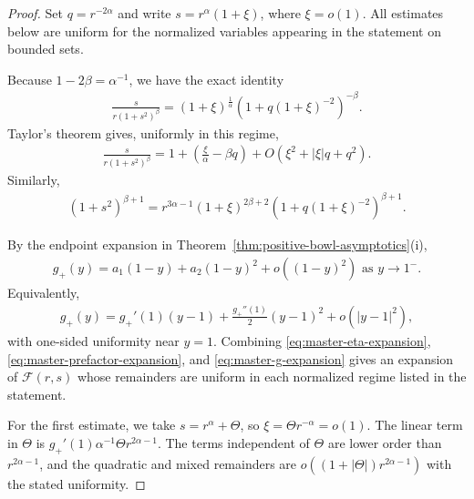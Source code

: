\documentclass{amsart}
\theoremstyle{plain}
\theoremstyle{mainintrothm}
\theoremstyle{definition}
\begin{document}
	\begin{proof}
		Set $q=r^{-2\alpha}$ and write $s=r^\alpha(1+\xi)$, where
		$\xi=o(1)$.  All estimates below are uniform for the normalized variables
		appearing in the statement on bounded sets.
		
		\medskip
		
		Because $1-2\beta=\alpha^{-1}$, we have the exact identity
		\begin{align}
			\label{eq:master-eta-expansion}
			\frac{s}{r(1+s^2)^\beta}
			=
			(1+\xi)^{\frac{1}{\alpha}}
			\left(1+q(1+\xi)^{-2}\right)^{-\beta}.
		\end{align}
		Taylor's theorem gives, uniformly in this regime,
		\begin{align*}
			\frac{s}{r(1+s^2)^\beta}
			=
			1
			+
			\left(\frac{\xi}{\alpha}-\beta q\right)
			+
			O(\xi^2+|\xi|q+q^2).
		\end{align*}
		Similarly,
		\begin{align}
			\label{eq:master-prefactor-expansion}
			(1+s^2)^{\beta+1}
			=
			r^{3\alpha-1}(1+\xi)^{2\beta+2}
			\left(1+q(1+\xi)^{-2}\right)^{\beta+1}.
		\end{align}
		
		\medskip
		
		By the endpoint expansion in
		Theorem~\ref{thm:positive-bowl-asymptotics}\textup{(i)},
		\begin{align*}
			g_+(y)
			=
			a_1(1-y)
			+
			a_2(1-y)^2
			+
			o((1-y)^2)
			\mbox{ as }y\to1^-.
		\end{align*}
		Equivalently,
		\begin{align}
			\label{eq:master-g-expansion}
			g_+(y)
			=
			g_+'(1)(y-1)
			+
			\frac{g_+''(1)}{2}(y-1)^2
			+
			o(|y-1|^2),
		\end{align}
		with one-sided uniformity near $y=1$.  Combining
		\eqref{eq:master-eta-expansion}, \eqref{eq:master-prefactor-expansion}, and
		\eqref{eq:master-g-expansion} gives an expansion of $\mathcal F(r,s)$ whose
		remainders are uniform in each normalized regime listed in the statement.
		
		\medskip
		
		For the first estimate, we take $s=r^\alpha+\Theta$, so
		$\xi=\Theta r^{-\alpha}=o(1)$.  The linear term in $\Theta$ is
		$g_+'(1)\alpha^{-1}\Theta r^{2\alpha-1}$.  The terms independent of
		$\Theta$ are lower order than $r^{2\alpha-1}$, and the quadratic and mixed
		remainders are
		$o((1+|\Theta|)r^{2\alpha-1})$ with the stated uniformity.
		
		\medskip
		

\end{proof}
\end{document}
